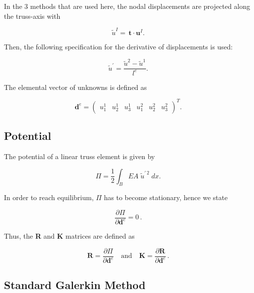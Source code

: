 In the 3 methods that are used here, the nodal displacements are projected along the truss-axis with

\begin{equation}
	\tilde{u}^{I}=\,\boldsymbol{t}\cdot\boldsymbol{u}^{I}.
	\label{eq:projection}
\end{equation}

Then, the following specification for the derivative of displacements is used:

\begin{equation}
\tilde{u}^{\prime}=\dfrac{\tilde{u}^{2}-\tilde{u}^{1}}{l^{e}}.
\label{eq:u_derivative}
\end{equation}

The elemental vector of unknowns is defined as

\begin{equation}
	\boldsymbol{d}^{e}=
		\begin{pmatrix}
			u^{1}_{1} & u^{1}_{2} & u^{1}_{3} & u^{2}_{1} & u^{2}_{2} & u^{2}_{3}
		\end{pmatrix}^{T}.
\end{equation}

\subsection{Potential}
The potential of a linear truss element is given by

\begin{equation}
	\Pi = \dfrac{1}{2}\displaystyle \int_{B}EA\; \tilde{u}^{\prime \, 2}\; dx.
	\label{eq:potential_truss}
\end{equation}


In order to reach equilibrium, $\Pi$ has to become stationary, hence we state

\begin{equation}
	\dfrac{\partial\Pi}{\partial \boldsymbol{d}^{e}}=0 \, .
	\label{eq:Pi_stationary}
\end{equation}

Thus, the \textbf{R} and \textbf{K} matrices are defined as

\begin{equation}
	\textbf{R}=\dfrac{\partial\Pi}{\partial\boldsymbol{d}^{e}}  \quad \text{and} \quad \textbf{K}=\dfrac{\partial\boldsymbol{R}}{\partial \boldsymbol{d}^{e}}\, .
	\label{R_K_Potential}
\end{equation}

\subsection{Standard Galerkin Method}

